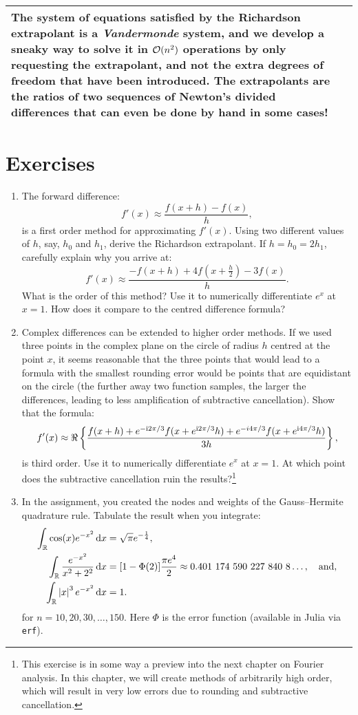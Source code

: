 \documentclass[11pt,letterpaper]{article}
\begin{document}
\begin{longtable}{p{}|p{}}
The system of equations satisfied by the Richardson extrapolant is a {\em Vandermonde} system, and we develop a sneaky way to solve it in $\mathcal{O}(n^2)$ operations by only requesting the extrapolant, and not the extra degrees of freedom that have been introduced. The extrapolants are the ratios of two sequences of Newton's divided differences that can even be done by hand in some cases!\\

\hline
\end{longtable}

\section*{Exercises}

\begin{enumerate}

\item The forward difference:
\[
f'(x) \approx \dfrac{f(x+h)-f(x)}{h},
\]
is a first order method for approximating $f'(x)$. Using two different values of $h$, say, $h_0$ and $h_1$, derive the Richardson extrapolant. If $h = h_0 = 2h_1$, carefully explain why you arrive at:
\[
f'(x) \approx \dfrac{-f(x+h)+4f(x+\tfrac{h}{2})-3f(x)}{h}.
\]
What is the order of this method? Use it to numerically differentiate $e^x$ at $x=1$. How does it compare to the centred difference formula?

\item Complex differences can be extended to higher order methods. If we used three points in the complex plane on the circle of radius $h$ centred at the point $x$, it seems reasonable that the three points that would lead to a formula with the smallest rounding error would be points that are equidistant on the circle (the further away two function samples, the larger the differences, leading to less amplification of subtractive cancellation). Show that the formula:
\[
f'(x) \approx \Re\left\{\dfrac{f(x+h)+e^{-{\rm i} 2\pi/3}f(x+e^{{\rm i}2\pi/3}h) + e^{-i4\pi/3}f(x+e^{{\rm i}4\pi/3}h)}{3h}\right\},
\]
is third order. Use it to numerically differentiate $e^x$ at $x=1$. At which point does the subtractive cancellation ruin the results?\footnote{This exercise is in some way a preview into the next chapter on Fourier analysis. In this chapter, we will create methods of arbitrarily high order, which will result in very low errors due to rounding and subtractive cancellation.}

\item In the assignment, you created the nodes and weights of the Gauss--Hermite quadrature rule. Tabulate the result when you integrate:
\begin{align*}
\int_{\mathbb{R}} \cos(x) e^{-x^2}{\rm\,d} x & = \sqrt{\pi}e^{-\frac{1}{4}},\\
\int_{\mathbb{R}} \dfrac{e^{-x^2}}{x^2+2^2}{\rm\,d} x & = [1-\Phi(2)]\dfrac{\pi e^4}{2} \approx 0.401~174~590~227~840~8\ldots,\quad{\rm and},\\
\int_{\mathbb{R}} \left|{x}\right|^3e^{-x^2}{\rm\,d} x & = 1.
\end{align*}
for $n=10,20,30,\ldots,150$. Here $\Phi$ is the error function (available in {\sc Julia} via \verb+erf+).


\end{enumerate}
\end{document}
